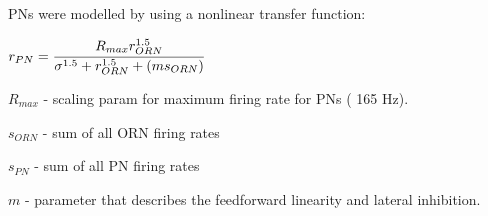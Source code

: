 
  PNs were modelled by using a nonlinear transfer function:

$r_{PN}=\cfrac{ R_{max}r^{1.5}_{ORN} } { \sigma^{1.5}+r^{1.5}_{ORN} + (ms_{ORN}) } $

\vspace{5 mm}

$R_{max}$ - scaling param for maximum firing rate for PNs ( 165 Hz).

\vspace{5 mm}

$s_{ORN}$ - sum of all ORN firing rates

\vspace{5 mm}

$s_{PN}$ - sum of all PN firing rates

\vspace{5 mm}

 $m$ - parameter that describes the feedforward linearity and lateral inhibition. 

 \vspace{5 mm}
  
  